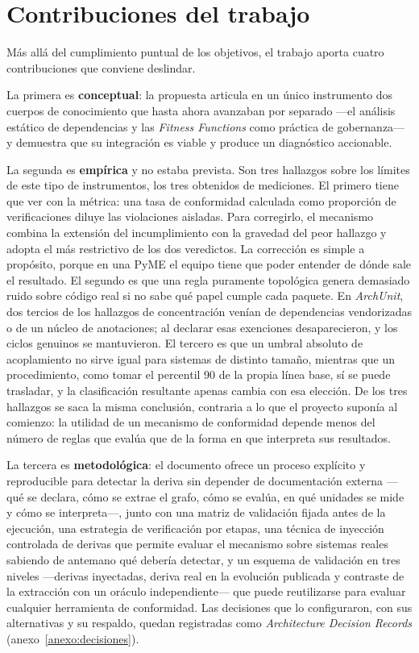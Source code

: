 \section{Contribuciones del trabajo}
Más allá del cumplimiento puntual de los objetivos, el trabajo aporta cuatro contribuciones que conviene deslindar.

La primera es \textbf{conceptual}: la propuesta articula en un único instrumento dos cuerpos de conocimiento que hasta ahora avanzaban por separado —el análisis estático de dependencias y las \textit{Fitness Functions} como práctica de gobernanza— y demuestra que su integración es viable y produce un diagnóstico accionable.

La segunda es \textbf{empírica} y no estaba prevista. Son tres hallazgos sobre los límites de este tipo de instrumentos, los tres obtenidos de mediciones. El primero tiene que ver con la métrica: una tasa de conformidad calculada como proporción de verificaciones diluye las violaciones aisladas. Para corregirlo, el mecanismo combina la extensión del incumplimiento con la gravedad del peor hallazgo y adopta el más restrictivo de los dos veredictos. La corrección es simple a propósito, porque en una PyME el equipo tiene que poder entender de dónde sale el resultado. El segundo es que una regla puramente topológica genera demasiado ruido sobre código real si no sabe qué papel cumple cada paquete. En \textit{ArchUnit}, dos tercios de los hallazgos de concentración venían de dependencias vendorizadas o de un núcleo de anotaciones; al declarar esas exenciones desaparecieron, y los ciclos genuinos se mantuvieron. El tercero es que un umbral absoluto de acoplamiento no sirve igual para sistemas de distinto tamaño, mientras que un procedimiento, como tomar el percentil 90 de la propia línea base, sí se puede trasladar, y la clasificación resultante apenas cambia con esa elección. De los tres hallazgos se saca la misma conclusión, contraria a lo que el proyecto suponía al comienzo: la utilidad de un mecanismo de conformidad depende menos del número de reglas que evalúa que de la forma en que interpreta sus resultados.

La tercera es \textbf{metodológica}: el documento ofrece un proceso explícito y reproducible para detectar la deriva sin depender de documentación externa ---qué se declara, cómo se extrae el grafo, cómo se evalúa, en qué unidades se mide y cómo se interpreta---, junto con una matriz de validación fijada antes de la ejecución, una estrategia de verificación por etapas, una técnica de inyección controlada de derivas que permite evaluar el mecanismo sobre sistemas reales sabiendo de antemano qué debería detectar, y un esquema de validación en tres niveles ---derivas inyectadas, deriva real en la evolución publicada y contraste de la extracción con un oráculo independiente--- que puede reutilizarse para evaluar cualquier herramienta de conformidad. Las decisiones que lo configuraron, con sus alternativas y su respaldo, quedan registradas como \textit{Architecture Decision Records} (anexo~\ref{anexo:decisiones}).

